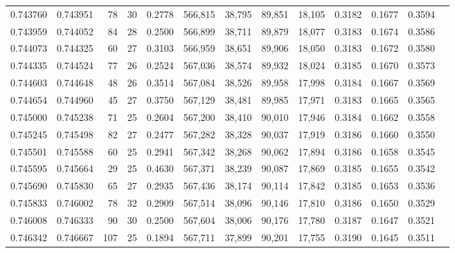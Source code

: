 \begin{tabular}{rrrrrrrrrrrrr}
0.743760 & 0.743951 &     78 &    30 &                                     0.2778 & 566,815 &  38,795 &  89,851 &  18,105 & 0.3182 & 0.1677 & 0.3594 \\
0.743959 & 0.744052 &     84 &    28 &                                     0.2500 & 566,899 &  38,711 &  89,879 &  18,077 & 0.3183 & 0.1674 & 0.3586 \\
0.744073 & 0.744325 &     60 &    27 &                                     0.3103 & 566,959 &  38,651 &  89,906 &  18,050 & 0.3183 & 0.1672 & 0.3580 \\
0.744335 & 0.744524 &     77 &    26 &                                     0.2524 & 567,036 &  38,574 &  89,932 &  18,024 & 0.3185 & 0.1670 & 0.3573 \\
0.744603 & 0.744648 &     48 &    26 &                                     0.3514 & 567,084 &  38,526 &  89,958 &  17,998 & 0.3184 & 0.1667 & 0.3569 \\
0.744654 & 0.744960 &     45 &    27 &                                     0.3750 & 567,129 &  38,481 &  89,985 &  17,971 & 0.3183 & 0.1665 & 0.3565 \\
0.745000 & 0.745238 &     71 &    25 &                                     0.2604 & 567,200 &  38,410 &  90,010 &  17,946 & 0.3184 & 0.1662 & 0.3558 \\
0.745245 & 0.745498 &     82 &    27 &                                     0.2477 & 567,282 &  38,328 &  90,037 &  17,919 & 0.3186 & 0.1660 & 0.3550 \\
0.745501 & 0.745588 &     60 &    25 &                                     0.2941 & 567,342 &  38,268 &  90,062 &  17,894 & 0.3186 & 0.1658 & 0.3545 \\
0.745595 & 0.745664 &     29 &    25 &                                     0.4630 & 567,371 &  38,239 &  90,087 &  17,869 & 0.3185 & 0.1655 & 0.3542 \\
0.745690 & 0.745830 &     65 &    27 &                                     0.2935 & 567,436 &  38,174 &  90,114 &  17,842 & 0.3185 & 0.1653 & 0.3536 \\
0.745833 & 0.746002 &     78 &    32 &                                     0.2909 & 567,514 &  38,096 &  90,146 &  17,810 & 0.3186 & 0.1650 & 0.3529 \\
0.746008 & 0.746333 &     90 &    30 &                                     0.2500 & 567,604 &  38,006 &  90,176 &  17,780 & 0.3187 & 0.1647 & 0.3521 \\
0.746342 & 0.746667 &    107 &    25 &                                     0.1894 & 567,711 &  37,899 &  90,201 &  17,755 & 0.3190 & 0.1645 & 0.3511 \\

\end{tabular}
